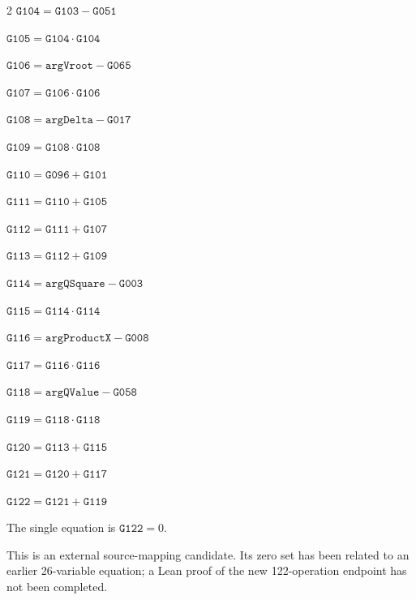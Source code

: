 \documentclass[10pt]{article}
\begin{document}
\begin{multicols}{2}
\noindent $\mathtt{G104}=\mathtt{G103}-\mathtt{G051}$\par
\noindent $\mathtt{G105}=\mathtt{G104}\cdot \mathtt{G104}$\par
\noindent $\mathtt{G106}=\mathtt{argVroot}-\mathtt{G065}$\par
\noindent $\mathtt{G107}=\mathtt{G106}\cdot \mathtt{G106}$\par
\noindent $\mathtt{G108}=\mathtt{argDelta}-\mathtt{G017}$\par
\noindent $\mathtt{G109}=\mathtt{G108}\cdot \mathtt{G108}$\par
\noindent $\mathtt{G110}=\mathtt{G096}+\mathtt{G101}$\par
\noindent $\mathtt{G111}=\mathtt{G110}+\mathtt{G105}$\par
\noindent $\mathtt{G112}=\mathtt{G111}+\mathtt{G107}$\par
\noindent $\mathtt{G113}=\mathtt{G112}+\mathtt{G109}$\par
\noindent $\mathtt{G114}=\mathtt{argQSquare}-\mathtt{G003}$\par
\noindent $\mathtt{G115}=\mathtt{G114}\cdot \mathtt{G114}$\par
\noindent $\mathtt{G116}=\mathtt{argProductX}-\mathtt{G008}$\par
\noindent $\mathtt{G117}=\mathtt{G116}\cdot \mathtt{G116}$\par
\noindent $\mathtt{G118}=\mathtt{argQValue}-\mathtt{G058}$\par
\noindent $\mathtt{G119}=\mathtt{G118}\cdot \mathtt{G118}$\par
\noindent $\mathtt{G120}=\mathtt{G113}+\mathtt{G115}$\par
\noindent $\mathtt{G121}=\mathtt{G120}+\mathtt{G117}$\par
\noindent $\mathtt{G122}=\mathtt{G121}+\mathtt{G119}$\par
\end{multicols}
\noindent The single equation is $\boxed{\mathtt{G122}=0}$.
\par\medskip
This is an external source-mapping candidate. Its zero set has been related to
an earlier 26-variable equation; a Lean proof of the new 122-operation endpoint
has not been completed.
\bigskip
\end{document}
